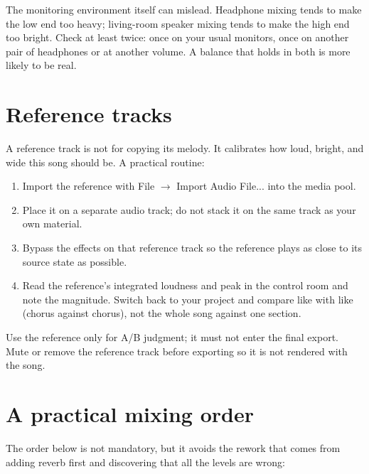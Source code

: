 The monitoring environment itself can mislead. Headphone mixing tends to make the
low end too heavy; living-room speaker mixing tends to make the high end too
bright. Check at least twice: once on your usual monitors, once on another pair
of headphones or at another volume. A balance that holds in both is more likely
to be real.

\section{Reference tracks}

A reference track is not for copying its melody. It calibrates how loud, bright,
and wide this song should be. A practical routine:

\begin{enumerate}
  \item Import the reference with File $\rightarrow$ Import Audio File... into the
        media pool.
  \item Place it on a separate audio track; do not stack it on the same track as
        your own material.
  \item Bypass the effects on that reference track so the reference plays as
        close to its source state as possible.
  \item Read the reference's integrated loudness and peak in the control room and
        note the magnitude. Switch back to your project and compare like with like
        (chorus against chorus), not the whole song against one section.
\end{enumerate}

Use the reference only for A/B judgment; it must not enter the final export. Mute
or remove the reference track before exporting so it is not rendered with the song.

\section{A practical mixing order}

The order below is not mandatory, but it avoids the rework that comes from adding
reverb first and discovering that all the levels are wrong:

